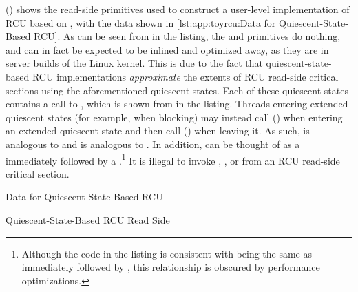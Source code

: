 \begin{fcvref}
()
shows the read-side primitives used to construct a user-level
implementation of RCU based on , with the data shown in
\cref{lst:app:toyrcu:Data for Quiescent-State-Based RCU}.
As can be seen from  in the listing,
the 
and  primitives do nothing, and can in fact
be expected to be inlined and optimized away, as they are in
server builds of the Linux kernel.
This is due to the fact that quiescent-state-based RCU implementations
\emph{approximate} the extents of RCU read-side critical sections
using the aforementioned quiescent states.
Each of these quiescent states contains a call to
, which is shown from
 in the listing.
Threads entering extended quiescent states (for example, when blocking)
may instead call 
() when entering
an extended quiescent state and then call
() when leaving it.
As such,  is analogous to 
and  is analogous to .
In addition,  can be thought of as a
 immediately followed by a
.\footnote{
	Although the code in the listing is consistent with
	being the same as  immediately followed by
	, this relationship is obscured by
	performance optimizations.}
It is illegal to invoke , ,
or  from an RCU read-side critical section.
\end{fcvref}

\begin{listing}

\caption{Data for Quiescent-State-Based RCU}
\label{lst:app:toyrcu:Data for Quiescent-State-Based RCU}
\end{listing}

\begin{listing}

\caption{Quiescent-State-Based RCU Read Side}
\label{lst:app:toyrcu:Quiescent-State-Based RCU Read Side}
\end{listing}

